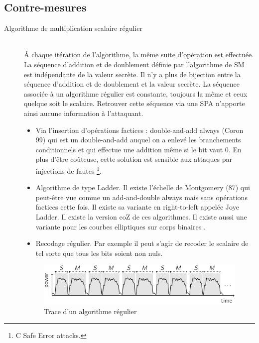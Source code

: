 \subsection{Contre-mesures}
\begin{description}
    \item[Algorithme de multiplication scalaire régulier] \hfill \\ \'A chaque itération de l'algorithme, la même suite d'opération est effectuée. La séquence d'addition et de doublement définie par l'algorithme de SM est indépendante de la valeur secrète. Il n'y a plus de bijection entre la séquence d'addition et de doublement et la valeur secrète. La séquence associée à un algorithme régulier est constante, toujours la même et ceux quelque soit le scalaire. Retrouver cette séquence via une SPA n'apporte ainsi aucune information à l'attaquant.
        \begin{itemize}[label=--]
            \item Via l'insertion d'opérations factices : double-and-add always (Coron 99) qui est un double-and-add auquel on a enlevé les branchements conditionnels \cite{coron1999resistance} et qui effectue une addition même si le bit vaut 0. En plus d'être coûteuse, cette solution est sensible aux attaques par injections de fautes \footnote{C Safe Error attacks.}.
            \item Algorithme de type Ladder. Il existe l'échelle de Montgomery (87) qui peut-être vue comme un add-and-double always mais sans opérations factices cette fois. Il existe sa variante en right-to-left appelée Joye Ladder. Il existe la version coZ de ces algorithmes. Il existe aussi une variante pour les courbes elliptiques sur corps binaires \cite{lopez1999fast}.
            \item Recodage régulier. Par exemple il peut s'agir de recoder le scalaire de tel sorte que tous les bits soient non nuls. 
        \end{itemize}
        \begin{figure}[ht]
        \centering
        \includegraphics[scale=0.5]{images/SSCA_regular.png}
        \caption{Trace d'un algorithme régulier}
        \label{fig:SSCA_regular}
        \end{figure}
    

\end{description}
